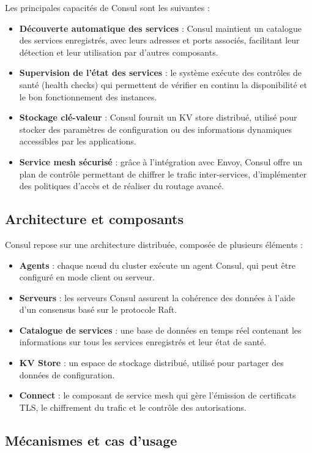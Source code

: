 Les principales capacités de Consul sont les suivantes :
\begin{itemize}
	\item \textbf{Découverte automatique des services} : Consul maintient un catalogue des services enregistrés, avec leurs adresses et ports associés, facilitant leur détection et leur utilisation par d’autres composants.
	\item \textbf{Supervision de l’état des services} : le système exécute des contrôles de santé (health checks) qui permettent de vérifier en continu la disponibilité et le bon fonctionnement des instances.
	\item \textbf{Stockage clé-valeur} : Consul fournit un KV store distribué, utilisé pour stocker des paramètres de configuration ou des informations dynamiques accessibles par les applications.
	\item \textbf{Service mesh sécurisé} : grâce à l’intégration avec Envoy, Consul offre un plan de contrôle permettant de chiffrer le trafic inter-services, d’implémenter des politiques d’accès et de réaliser du routage avancé.
\end{itemize}

\subsection{Architecture et composants}

Consul repose sur une architecture distribuée, composée de plusieurs éléments :
\begin{itemize}
	\item \textbf{Agents} : chaque nœud du cluster exécute un agent Consul, qui peut être configuré en mode client ou serveur.
	\item \textbf{Serveurs} : les serveurs Consul assurent la cohérence des données à l’aide d’un consensus basé sur le protocole Raft.
	\item \textbf{Catalogue de services} : une base de données en temps réel contenant les informations sur tous les services enregistrés et leur état de santé.
	\item \textbf{KV Store} : un espace de stockage distribué, utilisé pour partager des données de configuration.
	\item \textbf{Connect} : le composant de service mesh qui gère l’émission de certificats TLS, le chiffrement du trafic et le contrôle des autorisations.
\end{itemize}

\subsection{Mécanismes et cas d’usage}

